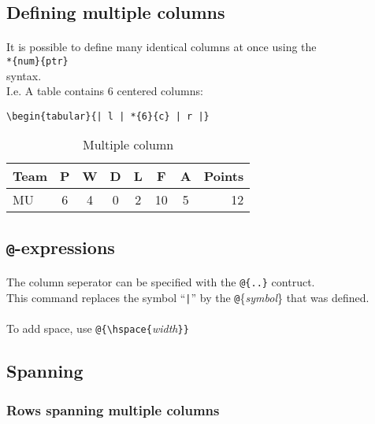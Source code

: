 \subsection[Multiple columns]{Defining multiple columns}
\paragraph{}
It is possible to define many identical columns at once using the \\
\verb|*{num}{ptr}|\\ syntax.\\
I.e. A table contains 6 centered columns:
\begin{verbatim}
\begin{tabular}{| l | *{6}{c} | r |}
\end{verbatim}
\begin{table}[htbp]
	\centering
	\begin{tabular}{| l | *{6}{c} | r |}
	Team & P & W & D & L & F & A & Points \\ \hline
	MU & 6 & 4 & 0 & 2 & 10 & 5 & 12 \\
	\end{tabular}
\caption{Multiple column}
\label{multicols}
\end{table}
\subsection{\texttt{@}-expressions}
\paragraph{}
The column seperator can be specified with the \verb|@{..}| contruct.\\
This command replaces the symbol ``\verb:|:'' by the \texttt{@}\{\emph{symbol}\} that was defined.

\paragraph{}
To add space, use \verb|@{\hspace{|\emph{width}\verb|}}|%



\subsection{Spanning}
\subsubsection{Rows spanning multiple columns}
